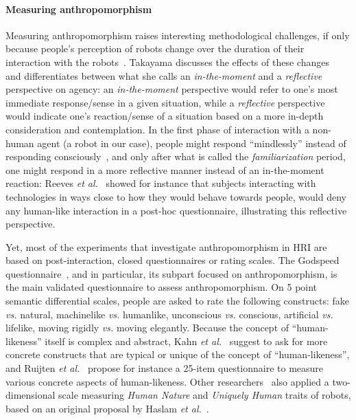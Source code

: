 \documentclass[lettersize, apacite, twoside, HRI]{apa_HRI}
\newcommand{\etal}{\textit{et al.}\xspace}
\newcommand{\vs}{\textit{vs.}\xspace}
\begin{document}
\paragraph{Measuring anthropomorphism} Measuring anthropomorphism raises
interesting methodological challenges, if only because people's perception of
robots change over the duration of their interaction with the
robots~\cite{lemaignan2014dynamics}. Takayama discusses the effects of these
changes~\cite{takayama_perspectives_2012} and differentiates between what she
calls an \emph{in-the-moment} and a \emph{reflective} perspective on agency: an
\emph{in-the-moment} perspective would refer to one's most immediate
response/sense in a given situation, while a \emph{reflective} perspective would
indicate one's reaction/sense of a situation based on a more in-depth
consideration and contemplation.  In the first phase of interaction with a
non-human agent (a robot in our case), people might respond ``mindlessly''
instead of responding consciously~\cite{nass_machines_2000}, and only after what
is called the \emph{familiarization} period, one might respond in a more
reflective manner instead of an in-the-moment reaction: Reeves
\etal~\cite{reeves_media_1996} showed for instance that subjects interacting
with technologies in ways close to how they would behave towards people, would
deny any human-like interaction in a post-hoc questionnaire, illustrating this
reflective perspective.

Yet, most of the experiments that investigate anthropomorphism in HRI are based
on post-interaction, closed questionnaires or rating scales.  The Godspeed
questionnaire~\cite{bartneck_measurement_2008}, and in particular, its subpart
focused on anthropomorphism, is the main validated questionnaire to assess
anthropomorphism. On 5 point semantic differential scales, people are asked to
rate the following constructs: fake \vs natural, machinelike \vs humanlike,
unconscious \vs conscious, artificial \vs lifelike, moving rigidly \vs moving
elegantly. Because the concept of ``human-likeness'' itself is complex and
abstract, Kahn \etal~\cite{kahn_jr._robotic_2006} suggest to ask for more
concrete constructs that are typical or unique of the concept of
``human-likeness'', and Ruijten \etal~\cite{ruijten_introducing_2014} propose
for instance a 25-item questionnaire to measure various concrete aspects of
human-likeness. Other researchers~\cite{zlotowski2014dimensions,salem2015would}
also applied a two-dimensional scale measuring \emph{Human Nature} and
\emph{Uniquely Human} traits of robots, based on an original proposal by Haslam
\etal~\cite{haslam2008attributing}.
\end{document}
